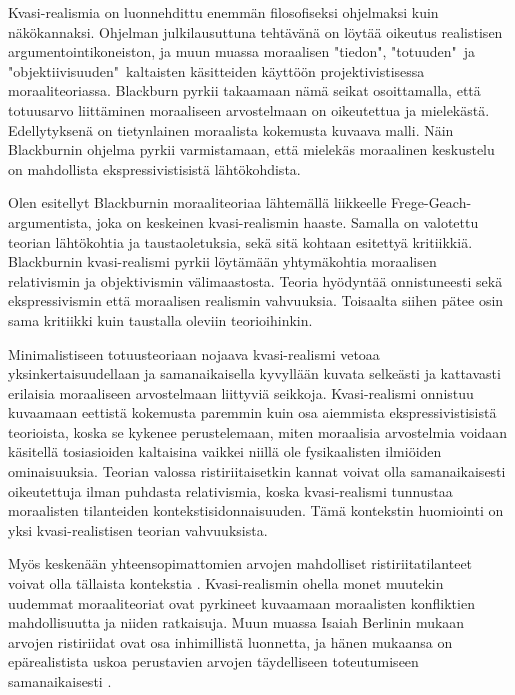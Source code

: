\documentclass[a4paper,12pt,times,titlepage,finnish]{article}
\begin{document}
Kvasi-realismia on luonnehdittu enemmän filosofiseksi ohjelmaksi kuin nä\-kö\-kan\-nak\-si. Ohjelman julkilausuttuna tehtävänä on löytää oikeutus realistisen argumentointikoneiston, ja muun muassa moraalisen "tiedon", "totuuden"\ ja "objektiivisuuden"\ kaltaisten käsitteiden käyttöön projektivistisessa moraaliteoriassa. Blackburn pyrkii takaamaan nämä seikat osoittamalla, että totuusarvo liittäminen moraaliseen arvostelmaan on oikeutettua ja mielekästä. Edellytyksenä on tietynlainen moraalista kokemusta kuvaava malli. Näin Blackburnin ohjelma pyrkii varmistamaan, että mielekäs moraalinen keskustelu on mahdollista ekspressivistisistä läh\-tö\-koh\-dis\-ta.

Olen esitellyt Blackburnin moraaliteoriaa lähtemällä liikkeelle Frege-Geach-\-argu\-men\-tis\-ta, joka on keskeinen kvasi-\-realismin haaste. Samalla on valotettu teorian lähtökohtia ja taustaoletuksia, sekä sitä kohtaan esitettyä kritiikkiä.  Blackburnin kvasi-\-realismi pyrkii löytämään yhtymäkohtia moraalisen relativismin ja objektivismin vä\-li\-maas\-tos\-ta. Teoria hyödyntää onnistuneesti sekä ekspressivismin että moraalisen realismin vahvuuksia. Toisaalta siihen pätee osin sama kritiikki kuin taustalla oleviin teorioihinkin.

Minimalistiseen totuusteoriaan nojaava kvasi-\-realismi vetoaa yksinkertaisuudellaan ja samanaikaisella kyvyllään kuvata selkeästi ja kattavasti erilaisia moraaliseen arvostelmaan liittyviä seikkoja. Kvasi-realismi onnistuu kuvaamaan eettistä kokemusta paremmin kuin osa aiemmista ekspressivistisistä teorioista, koska se kykenee perustelemaan, miten moraalisia arvostelmia voidaan käsitellä tosiasioiden kaltaisina vaikkei niillä ole fysikaalisten ilmiöiden ominaisuuksia. Teorian valossa ristiriitaisetkin kannat voivat olla samanaikaisesti oikeutettuja ilman puhdasta relativismia, koska kvasi-\-realismi tunnustaa moraalisten tilanteiden kontekstisidonnaisuuden. Tä\-mä kontekstin huomiointi on yksi kvasi-\-realistisen teorian vahvuuksista. 

Myös keskenään yhteensopimattomien arvojen mahdolliset ristiriitatilanteet voivat olla tällaista kontekstia \citep[ks. esim.][174]{Nagel87}. Kvasi-realismin ohella monet muutekin uudemmat moraaliteoriat ovat pyrkineet kuvaamaan moraalisten konfliktien mahdollisuutta ja niiden ratkaisuja. Muun muassa Isaiah Berlinin mukaan arvojen ristiriidat ovat osa inhimillistä luonnetta, ja hänen mukaansa on epä\-rea\-lis\-tis\-ta uskoa perustavien arvojen täydelliseen toteutumiseen samanaikaisesti \citep[luku 1]{Berlin98}. 
\end{document}

